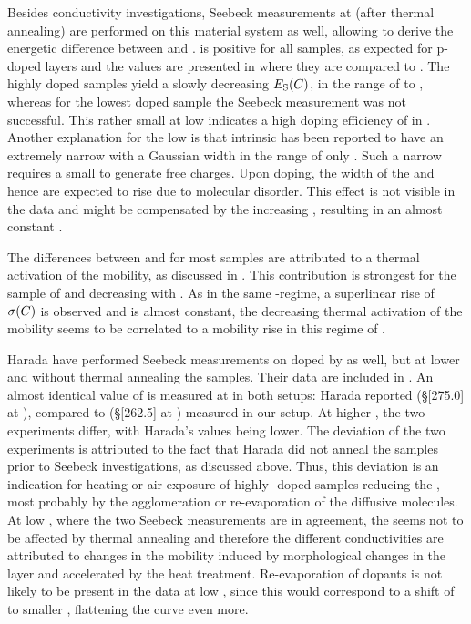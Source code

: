 Besides conductivity investigations, Seebeck measurements at \Tm[40] (after thermal annealing) are performed on this material system as well, allowing to derive the energetic difference \Es between \EfLongL and \EtLongL.
\Es is positive for all samples, as expected for p-doped layers and the values are presented in  where they are compared to \Eact.
The highly doped samples yield a slowly decreasing $\Es(\C)$, in the range of \Es[103] to , whereas for the lowest doped sample the Seebeck measurement was not successful.
This rather small \Es at low \C indicates a high doping efficiency of \FV in \pen. Another explanation for the low \Es is that intrinsic \pen has been reported to have an extremely narrow \dosLongL with a Gaussian width in the range of only \gausswidth[70]\cite{Yogev2011}. Such a narrow \dos requires a small \Es to generate free charges.
Upon doping, the width of the \dos and hence \Es are expected to rise due to molecular disorder. This effect is not visible in the data and might be compensated by the increasing \CLong, resulting in an almost constant \Es.

The differences between \Es and \Eact for most samples are attributed to a thermal activation of the mobility, as discussed in . This contribution is strongest for the sample of \C[0.011] and decreasing with \C. As in the same \C-regime, a superlinear rise of $\c(\C)$ is observed and \Es is almost constant, the decreasing thermal activation of the mobility seems to be correlated to a mobility rise in this regime of \C.

Harada\etal\cite{Harada2010} have performed Seebeck measurements on \pen doped by \FV as well, but at lower \Tm[24] and without thermal annealing the samples. Their data are included in .
An almost identical value of \Es is measured at \C[0.020] in both setups: Harada reported \Es[81.7] (\S[275.0] at \Tm[24]), compared to \Es[82.2] (\S[262.5] at \Tm[40]) measured in our setup.
At higher \CLongs, the two experiments differ, with Harada's values being lower.
The deviation of the two experiments is attributed to the fact that Harada did not anneal the samples prior to Seebeck investigations, as discussed above. Thus, this deviation is an indication for heating or air-exposure of highly \FV-doped \pen samples reducing the \nhLong, most probably by the agglomeration or re-evaporation of the diffusive \FV molecules. At low \CLongs, where the two Seebeck measurements are in agreement, the \nhLong seems not to be affected by thermal annealing and therefore the different conductivities are attributed to changes in the mobility induced by morphological changes in the layer and accelerated by the heat treatment.
%
Re-evaporation of dopants is not likely to be present in the data at low \C, since this would correspond to a shift of \Es to smaller \CLongs, flattening the curve even more.

